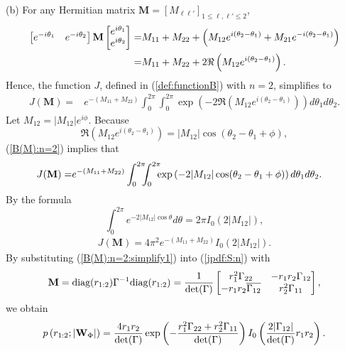 \documentclass{amsart}
\begin{document}
(b)
For any Hermitian matrix $\mathbf{M}=[M_{\ell\ell'}]_{1\leq\ell,\ell'\leq 2}$,
\begin{align}\notag
\begin{bmatrix} e^{-i\theta_{1}} & e^{-i\theta_{2}}\end{bmatrix}\mathbf{M}\begin{bmatrix} e^{i\theta_{1}} \\ e^{i\theta_{2}}\end{bmatrix}
=&
M_{11} +  M_{22} +  \left(M_{12} e^{i(\theta_2 - \theta_1)} + M_{21} e^{-i(\theta_2 - \theta_1)}\right)
\\\notag=&M_{11} +  M_{22} +2 \Re \left(M_{12} e^{i(\theta_2 - \theta_1)}\right).
\end{align}
Hence, the function $J$, defined in (\ref{def:functionB}) with $n=2$, simplifies to
\begin{align}\label{B(M):n=2}
J(\mathbf{M})=&e^{- (M_{11} +  M_{22})}
\int_0^{2\pi} \int_0^{2\pi} \exp \left(- 2 \Re \left(M_{12} e^{i(\theta_2 - \theta_1)}\right) \right) d\theta_1 d\theta_2.
\end{align}
Let $M_{12} = |M_{12}| e^{i\phi}$. Because
$$
\Re\left(M_{12} e^{i(\theta_2 - \theta_1)}\right)= |M_{12}| \cos(\theta_2 - \theta_1 + \phi),
$$
(\ref{B(M):n=2}) implies that
\begin{align}\notag
J(\mathbf{M}) =& e^{- (M_{11} +  M_{22})}
\int_0^{2\pi}\hspace{-0.2cm} \int_0^{2\pi}\hspace{-0.2cm} \exp \left( -2 |M_{12}| \cos(\theta_2 - \theta_1 + \phi) \right) d\theta_1 d\theta_2.
\end{align}
By the formula
\[
\int_0^{2\pi} e^{-2 |M_{12}| \cos \theta} d\theta = 2\pi I_0\left(2 |M_{12}|\right),
\]
\begin{align}\label{B(M):n=2:simplify1}
J(\mathbf{M}) =
4\pi^2 e^{- (M_{11} +  M_{22})} I_0\left(2 |M_{12}|\right).
\end{align}
By substituting (\ref{B(M):n=2:simplify1}) into (\ref{jpdf:S:n}) with
\begin{align}\notag
\mathbf{M}= \textup{diag}(r_{1:2})\Gamma^{-1}\textup{diag}(r_{1:2})
=\frac{1}{\textup{det}(\Gamma)}
\begin{bmatrix}
r_{1}^{2}\Gamma_{22} & -r_{1}r_{2}\Gamma_{12} \\
-r_{1}r_{2}\overline{\Gamma_{12}} & r_{2}^{2}\Gamma_{11}
\end{bmatrix},
\end{align}
we obtain
\begin{align}\notag
p\left(r_{1:2};|\mathbf{W}_{\Phi}|\right)
=
\frac{4r_{1}r_{2}}{\textup{det}(\Gamma)}\exp\left(- \frac{r_{1}^{2}\Gamma_{22} +  r_{2}^{2}\Gamma_{11}}{\textup{det}(\Gamma)}\right) I_0\left(\frac{2|\Gamma_{12}|}{\textup{det}(\Gamma)}r_{1}r_{2}\right).
\end{align}
\end{document}
